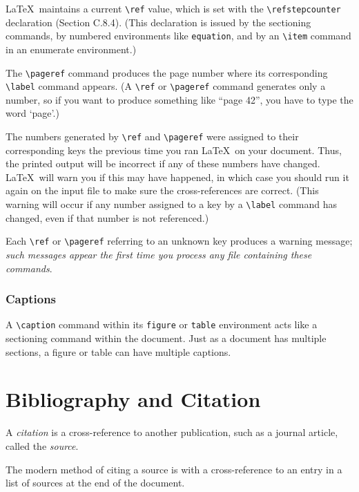 \documentclass{article}
\begin{document}
\LaTeX\ maintains a current \verb:\ref: value, which is set with the \verb:\refstepcounter: 
declaration (Section C.8.4). (This declaration is issued by the sectioning commands, by numbered
environments like {\tt equation}, and by an \verb:\item: command in an enumerate environment.)

The \verb:\pageref: command produces the page number where its corresponding \verb:\label: 
command appears. (A \verb:\ref: or \verb:\pageref: command generates only a number, so if you 
want to produce something like ``page 42'', you have to type the word `page'.)

The numbers generated by \verb:\ref: and \verb:\pageref: were assigned to their corresponding
keys the previous time you ran \LaTeX\ on your document. Thus, the printed output will be incorrect
if any of these numbers have changed. \LaTeX\ will warn you if this may have happened, in which
case you should run it again on the input file to make sure the cross-references are correct.
(This warning will occur if any number assigned to a key by a \verb:\label: command has changed,
even if that number is not referenced.) 

Each \verb:\ref: or \verb:\pageref: referring to an unknown key produces a warning
message; \emph{such messages appear the first time you process any file containing these commands}.

\subsubsection{Captions} 

A \verb:\caption: command within its {\tt figure} or {\tt table} environment acts like a
sectioning command within the document. Just as a document has multiple sections, a figure or table
can have multiple captions.


\section{Bibliography and Citation}

A \emph{citation} is a cross-reference to another publication, such as a journal article, called
the \emph{source}.

The modern method of citing a source is with a cross-reference
to an entry in a list of sources at the end of the document. 
\end{document}
